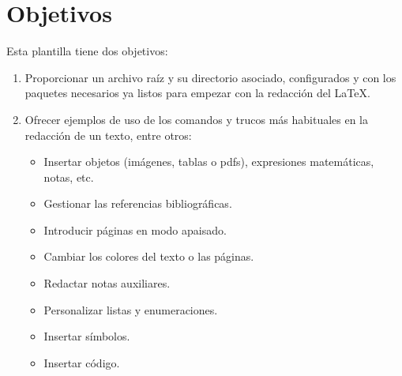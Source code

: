 \chapter{Objetivos}
Esta plantilla tiene dos objetivos:
\begin{enumerate}
	\item Proporcionar un archivo raíz y su directorio asociado, configurados y con los paquetes necesarios ya listos para empezar con la redacción del \LaTeX.
	\item Ofrecer ejemplos de uso de los comandos y trucos más habituales en la redacción de un texto, entre otros:
	\begin{itemize}
		\item Insertar objetos (imágenes, tablas o pdfs), expresiones matemáticas, notas, etc.
		\item Gestionar las referencias bibliográficas.
		\item Introducir páginas en modo apaisado.
		\item Cambiar los colores del texto o las páginas.
		\item Redactar notas auxiliares.
		\item Personalizar listas y enumeraciones.
		\item Insertar símbolos.
		\item Insertar código.
	\end{itemize}
\end{enumerate}